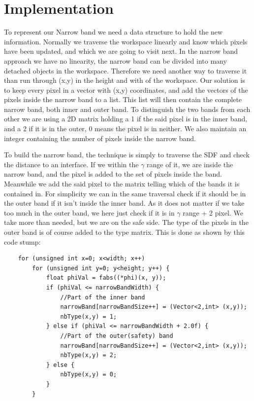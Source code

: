 \section{Implementation}
To represent our Narrow band we need a data structure to hold the new
information. Normally we traverse the workspace linearly and know
which pixels have been updated, and which we are going to visit
next. In the narrow band approach we have no linearity, the narrow
band can be divided into many detached objects in the
workspace. Therefore we need another way to traverse it than run
through (x,y) in the height and with of the workspace. Our solution is
to keep every pixel in a vector with (x,y) coordinates, and add the
vectors of the pixels inside the narrow band to a list. This list will
then contain the complete narrow band, both inner and outer band. To
distinguish the two bands from each other we are using a 2D matrix
holding a 1 if the said pixel is in the inner band, and a 2 if it is
in the outer, 0 means the pixel is in neither. We also maintain an
integer containing the number of pixels inside the narrow band.

To build the narrow band, the technique is simply to traverse the SDF
and check the distance to an interface. If we within the $\gamma$
range of it, we are inside the narrow band, and the pixel is added to
the set of pixels inside the band. Meanwhile we add the said pixel to
the matrix telling which of the bands it is contained in. For
simplicity we can in the same traversal check if it should be in the
outer band if it isn't inside the inner band. As it does not matter if
we take too much in the outer band, we here just check if it is in
$\gamma$ range + 2 pixel. We take more than needed, but we are on the
safe side. The type of the pixels in the outer band is of course added
to the type matrix. This is done as shown by this code stump:

\begin{lstlisting}
    for (unsigned int x=0; x<width; x++)
        for (unsigned int y=0; y<height; y++) {
            float phiVal = fabs((*phi)(x, y));
            if (phiVal <= narrowBandWidth) {
                //Part of the inner band
                narrowBand[narrowBandSize++] = (Vector<2,int> (x,y));
                nbType(x,y) = 1;
            } else if (phiVal <= narrowBandWidth + 2.0f) {
                //Part of the outer(safety) band
                narrowBand[narrowBandSize++] = (Vector<2,int> (x,y));
                nbType(x,y) = 2;
            } else {
                nbType(x,y) = 0;
            }
        }
\end{lstlisting}



